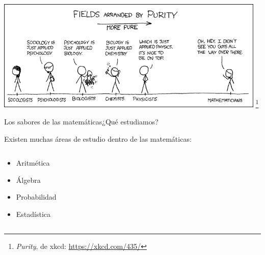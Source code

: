 \documentclass[spanish]{beamer}
\newcommand\blfootnote[1]{%
\begingroup
\renewcommand\thefootnote{}\footnote{#1}%
\addtocounter{footnote}{-1}%
\endgroup
}
\begin{document}
\begin{frame}[plain]
    \begin{center}
        \includegraphics[width=0.97\textwidth]{../img/purity.png}
    \blfootnote{\textit{Purity}, de xkcd: \url{https://xkcd.com/435/}}
    \end{center}
\end{frame}

\begin{frame}{Los sabores de las matemáticas}{¿Qué estudiamos?}
    
    Existen muchas áreas de estudio dentro de las matemáticas: \pause

    \bigskip

    \begin{columns}
        \begin{column}{0.5\textwidth}
            \begin{itemize}
                \item<2-> \alert<7>{Aritmética}
                \item<3-> \alert<8>{Álgebra}
                \item<4-> \alert<9>{Probabilidad}
                \item<5-> \alert<10>{Estadística}
            \end{itemize}
        \end{column}
        \begin{column}{0.5\textwidth}
        \end{column}
    \end{columns}

    \bigskip
    
\end{frame}
\end{document}

